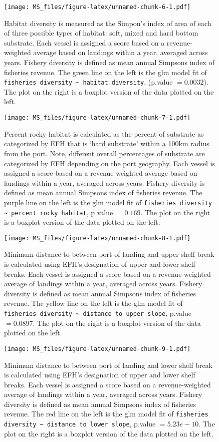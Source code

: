 \documentclass[]{article}
\begin{document}
\begin{figure}[htbp]
\centering
\texttt{[image: MS\_files/figure-latex/unnamed-chunk-6-1.pdf]}
\caption{Habitat diversity is measured as the Simpon's index of area of
each of three possible types of habitat: soft, mixed and hard bottom
substrate. Each vessel is assigned a score based on a revenue-weighted
average based on landings within a year, averaged across years. Fishery
diversity is defined as mean annual Simpsons index of fisheries revenue.
The green line on the left is the glm model fit of
\texttt{fisheries diversity \textasciitilde{} habitat diversity},
(p.value \(= 0.0032\)). The plot on the right is a boxplot version of
the data plotted on the left.}
\end{figure}

\begin{figure}[htbp]
\centering
\texttt{[image: MS\_files/figure-latex/unnamed-chunk-7-1.pdf]}
\caption{Percent rocky habitat is calculated as the percent of substrate
as categorized by EFH that is `hard substrate' within a 100km radius
from the port. Note, different overall percentages of substrate are
categorized by EFH depending on the port geography. Each vessel is
assigned a score based on a revenue-weighted average based on landings
within a year, averaged across years. Fishery diversity is defined as
mean annual Simpsons index of fisheries revenue. The purple line on the
left is the glm model fit of
\texttt{fisheries diversity \textasciitilde{} percent rocky habitat}, p
value \(=0.169\). The plot on the right is a boxplot version of the data
plotted on the left.}
\end{figure}

\begin{figure}[htbp]
\centering
\texttt{[image: MS\_files/figure-latex/unnamed-chunk-8-1.pdf]}
\caption{Minimum distance to between port of landing and upper shelf
break is calculated using EFH's designation of upper and lower shelf
breaks. Each vessel is assigned a score based on a revenue-weighted
average of landings within a year, averaged across years. Fishery
diversity is defined as mean annual Simpsons index of fisheries revenue.
The yellow line on the left is the glm model fit of
\texttt{fisheries diversity \textasciitilde{} distance to upper slope},
p.value \(=0.0897\). The plot on the right is a boxplot version of the
data plotted on the left.}
\end{figure}

\begin{figure}[htbp]
\centering
\texttt{[image: MS\_files/figure-latex/unnamed-chunk-9-1.pdf]}
\caption{Minimum distance to between port of landing and lower shelf
break is calculated using EFH's designation of upper and lower shelf
breaks. Each vessel is assigned a score based on a revenue-weighted
average of landings within a year, averaged across years. Fishery
diversity is defined as mean annual Simpsons index of fisheries revenue.
The red line on the left is the glm model fit of
\texttt{fisheries diversity \textasciitilde{} distance to lower slope},
p.value \(=5.23e-10\). The plot on the right is a boxplot version of the
data plotted on the left.}
\end{figure}
\end{document}
